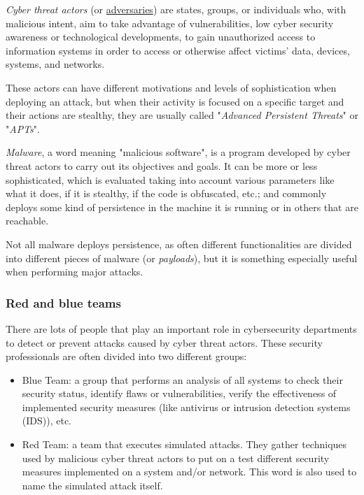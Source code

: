 \textit{Cyber threat actors} (or \underline{adversaries}) are states, groups, or individuals who, with malicious intent, aim to take advantage of vulnerabilities, low cyber security awareness or technological developments, to gain unauthorized access to information systems in order to access or otherwise affect victims' data, devices, systems, and networks.

These actors can have different motivations and levels of sophistication when deploying an attack, but when their activity is focused on a specific target and their actions are stealthy, they are usually called "\textit{Advanced Persistent Threats}" or "\textit{APTs}". 

\textit{Malware}, a word meaning "malicious software", is a program developed by cyber threat actors to carry out its objectives and goals. It can be more or less sophisticated, which is evaluated taking into account various parameters like what it does, if it is stealthy, if the code is obfuscated, etc.; and commonly deploys some kind of persistence in the machine it is running or in others that are reachable. 

\pagebreak
Not all malware deploys persistence, as often different functionalities are divided into different pieces of malware (or \textit{payloads}), but it is something especially useful when performing major attacks.

\subsubsection{Red and blue teams}
\label{sssec:redTeam}

There are lots of people that play an important role in cybersecurity departments to detect or prevent attacks caused by cyber threat actors. These security professionals are often divided into two different groups:
\begin{itemize}
\item Blue Team: a group that performs an analysis of all systems to check their security status, identify flaws or vulnerabilities, verify the effectiveness of implemented security measures (like antivirus or intrusion detection systems (IDS)), etc.

\item Red Team: a team that executes simulated attacks. They gather techniques used by malicious cyber threat actors to put on a test different security measures implemented on a system and/or network. This word is also used to name the simulated attack itself.
\end{itemize}

